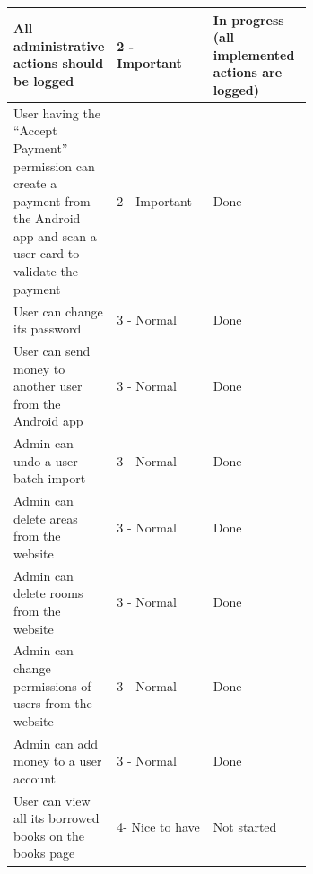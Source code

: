 \documentclass[twoside, openright,11pt,a4paper]{book}
\begin{document}
\begin{longtable}[c]{|p{0.33\linewidth}|l|p{0.33\linewidth}|}
All administrative actions should be logged                                                                                                    & 2 - Important     & In progress (all implemented actions are logged) \\ \hline
User having the “Accept Payment” permission can create a payment from the Android app and scan a user card to validate the payment             & 2 - Important     & Done                                             \\ \hline
User can change its password                                                                                                                   & 3 - Normal        & Done                                             \\ \hline
User can send money to another user from the Android app                                                                                       & 3 - Normal        & Done                                             \\ \hline
Admin can undo a user batch import                                                                                                             & 3 - Normal        & Done                                             \\ \hline
Admin can delete areas from the website                                                                                                        & 3 - Normal        & Done                                             \\ \hline
Admin can delete rooms from the website                                                                                                        & 3 - Normal        & Done                                             \\ \hline
Admin can change permissions of users from the website                                                                                         & 3 - Normal        & Done                                             \\ \hline
Admin can add money to a user account                                                                                                          & 3 - Normal        & Done                                             \\ \hline
User can view all its borrowed books on the books page                                                                                         & 4- Nice to have   & Not started                                      \\ \hline

\end{longtable}
\end{document}
